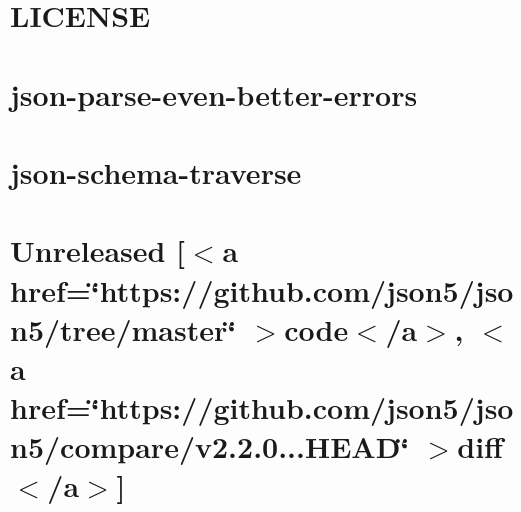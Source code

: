 \documentclass[twoside]{book}
\newcommand{\+}{\discretionary{\mbox{\scriptsize$\hookleftarrow$}}{}{}}
\begin{document}
\chapter{LICENSE}
\label{md__c___users_vaishnavi_jadhav__desktop__developer_code_mean_stack_example_client_node_modules_je827c15381ca463f8430eed03388fce3}

\chapter{json-\/parse-\/even-\/better-\/errors}
\label{md__c___users_vaishnavi_jadhav__desktop__developer_code_mean_stack_example_client_node_modules_jcb3ef00c33dbb99b93c305b607dd648d}

\chapter{json-\/schema-\/traverse}
\label{md__c___users_vaishnavi_jadhav__desktop__developer_code_mean_stack_example_client_node_modules_j7ef965bc213fe9f0f093d63f78af497a}

\chapter{Unreleased \mbox{[}\texorpdfstring{$<$}{<}a href=\char`\"{}https\+://github.\+com/json5/json5/tree/master\char`\"{} \texorpdfstring{$>$}{>}code\texorpdfstring{$<$}{<}/a\texorpdfstring{$>$}{>}, \texorpdfstring{$<$}{<}a href=\char`\"{}https\+://github.\+com/json5/json5/compare/v2.\+2.\+0...\+HEAD\char`\"{} \texorpdfstring{$>$}{>}diff\texorpdfstring{$<$}{<}/a\texorpdfstring{$>$}{>}\mbox{]}}
\label{md__c___users_vaishnavi_jadhav__desktop__developer_code_mean_stack_example_client_node_modules_json5__c_h_a_n_g_e_l_o_g}

\end{document}
